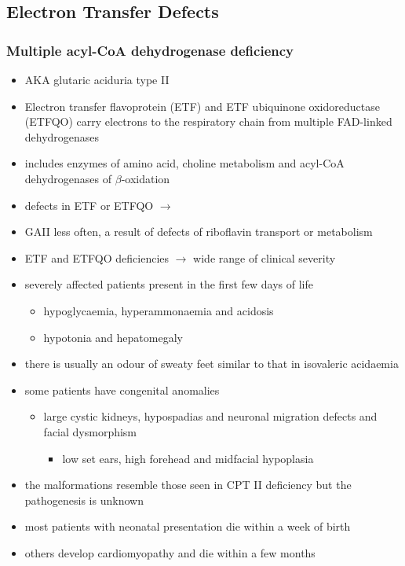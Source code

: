 \documentclass{scrartcl}
\begin{document}
\subsection{Electron Transfer Defects}
\label{sec:orgfda4a96}
\subsubsection{Multiple acyl-CoA dehydrogenase deficiency}
\label{sec:org0b11aef}
\begin{itemize}
\item AKA glutaric aciduria type II
\item Electron transfer flavoprotein (ETF) and ETF ubiquinone
oxidoreductase (ETFQO) carry electrons to the respiratory chain from
multiple FAD-linked dehydrogenases
\item includes enzymes of amino acid, choline metabolism and acyl-CoA
dehydrogenases of \(\beta\)-oxidation
\item defects in ETF or ETFQO \(\to\)
\item GAII less often, a result of defects of riboflavin transport or
metabolism
\item ETF and ETFQO deficiencies \(\to\) wide range of clinical severity
\item severely affected patients present in the first few days of life
\begin{itemize}
\item hypoglycaemia, hyperammonaemia and acidosis
\item hypotonia and hepatomegaly
\end{itemize}
\item there is usually an odour of sweaty feet similar to that in isovaleric acidaemia
\item some patients have congenital anomalies
\begin{itemize}
\item large cystic kidneys, hypospadias and neuronal migration defects and facial dysmorphism
\begin{itemize}
\item low set ears, high forehead and midfacial hypoplasia
\end{itemize}
\end{itemize}
\item the malformations resemble those seen in CPT II deficiency but the pathogenesis is unknown
\item most patients with neonatal presentation die within a week of birth
\item others develop cardiomyopathy and die within a few months

\end{itemize}
\end{document}
